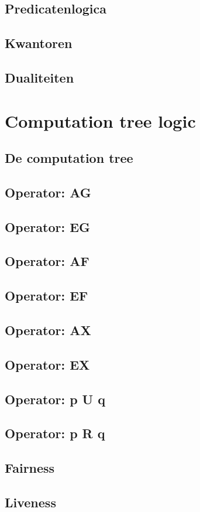 \documentclass{article}
\begin{document}
\subsection{Predicatenlogica}

\subsection{Kwantoren}

\subsection{Dualiteiten}

\section{Computation tree logic}

\subsection{De computation tree}

\subsection{Operator: AG}

\subsection{Operator: EG}

\subsection{Operator: AF}

\subsection{Operator: EF}

\subsection{Operator: AX}

\subsection{Operator: EX}

\subsection{Operator: p U q}

\subsection{Operator: p R q}

\subsection{Fairness}

\subsection{Liveness}

\newpage

\newpage


\end{document}

